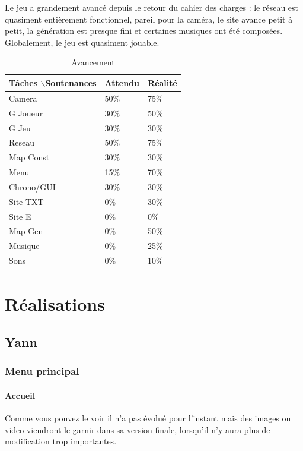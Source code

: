 \documentclass{article}
\begin{document}
Le jeu a grandement avancé depuis le retour du cahier des charges : le réseau est quasiment entièrement fonctionnel, pareil pour la caméra, le site avance petit à petit, la génération est presque fini et certaines musiques ont été composées. Globalement, le jeu est quasiment jouable.
\begin{table}[!h]
\centering
\caption{Avancement}
\begin{tabular}{|l|l|l|}

\hline
Tâches $\backslash$Soutenances & Attendu & Réalité \\ \hline
Camera & 50\% & 75\% \\ \hline
G Joueur & 30\% & 50\% \\ \hline
G Jeu & 30\% & 30\% \\ \hline
Reseau & 50\% & 75\% \\ \hline
Map Const & 30\% & 30\% \\ \hline
Menu & 15\% & 70\% \\ \hline
Chrono/GUI & 30\% & 30\% \\ \hline
Site TXT & 0\% & 30\% \\ \hline
Site E & 0\% & 0\% \\ \hline
Map Gen & 0\% & 50\% \\ \hline
Musique & 0\% & 25\% \\ \hline
Sons & 0\% & 10\% \\ \hline

\end{tabular}
\end{table}
 
\newpage
\section{Réalisations}



\subsection{Yann}

\subsubsection{Menu principal}

\paragraph{Accueil}
Comme vous pouvez le voir il n'a pas évolué pour l'instant mais des images ou video viendront le garnir dans sa version finale, lorsqu'il n'y aura plus de modification trop importantes.
\end{document}
